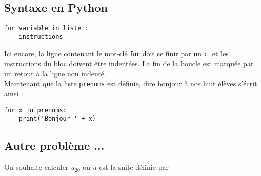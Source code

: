 

\subsection{Syntaxe en Python}

\begin{lstlisting}
for variable in liste :
    instructions
\end{lstlisting}

Ici encore, la ligne contenant le mot-clé \textbf{for} doit se finir par un \og \textbf{:} \fg\ et les 
instructions du bloc doivent être indentées. La fin de la boucle est marquée par un retour à la 
ligne non indenté.\\

Maintenant que la liste \texttt{prenoms} est définie, dire bonjour à nos huit élèves s'écrit ainsi :


\begin{lstlisting}
for x in prenoms:
    print('Bonjour ' + x)
\end{lstlisting}


\subsection{Autre problème ...}
On souhaite calculer $u_{20}$ où $u$ est la suite définie par

